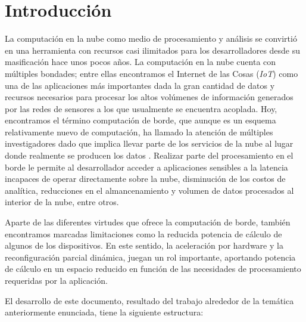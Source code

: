 
\chapter{Introducción} %
\label{Chapter1}

La computación en la nube como medio de procesamiento y análisis se convirtió en una herramienta con recursos casi ilimitados para los desarrolladores desde su masificación hace unos pocos años. La computación en la nube cuenta con múltiples bondades; entre ellas encontramos el Internet de las Cosas (\textit{IoT}) como una de las aplicaciones más importantes dada la gran cantidad de datos y recursos necesarios para procesar los altos volúmenes de información generados por las redes de sensores a los que usualmente se encuentra acoplada. Hoy, encontramos el término computación de borde, que aunque es un esquema relativamente nuevo de computación, ha llamado la atención de múltiples investigadores dado que implica llevar parte de los servicios de la nube al lugar donde realmente se producen los datos \cite{bonomi2014fog}. Realizar parte del procesamiento en el borde le permite al desarrollador acceder a aplicaciones sensibles a la latencia incapaces de operar directamente sobre la nube, disminución de los costos de analítica, reducciones en el almancenamiento y volumen de datos procesados al interior de la nube, entre otros.


Aparte de las diferentes virtudes que ofrece la computación de borde, también encontramos marcadas limitaciones como la reducida potencia de cálculo de algunos de los dispositivos. En este sentido, la aceleración por hardware y la reconfiguración parcial dinámica, juegan un rol importante, aportando potencia de cálculo en un espacio reducido en función de las necesidades de procesamiento requeridas por la aplicación.

El desarrollo de este documento, resultado del trabajo alrededor de la temática anteriormente enunciada, tiene la siguiente estructura:

